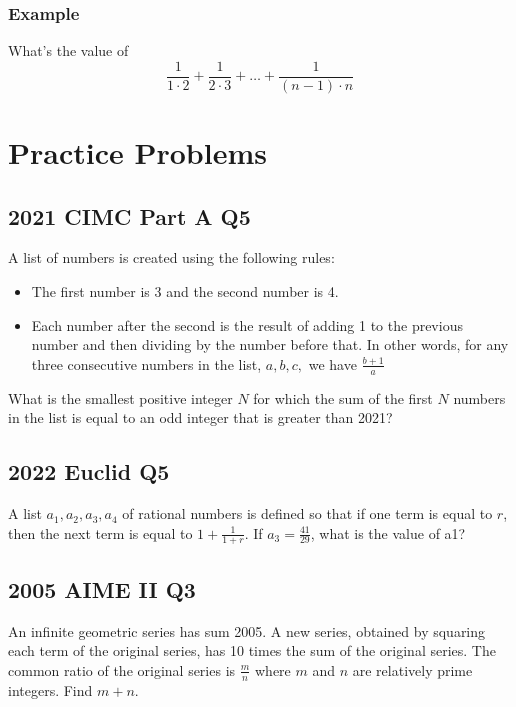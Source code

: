 \documentclass{article}
\begin{document}
\subsubsection{Example}

What's the value of $$\frac{1}{1\cdot2}+\frac{1}{2\cdot3}+\dots+\frac{1}{(n-1)\cdot n}$$
\vspace{100px}

\section{Practice Problems}

\subsection{2021 CIMC Part A Q5}

A list of numbers is created using the following rules:
\begin{itemize}
    \item The first number is 3 and the second number is 4.
    \item Each number after the second is the result of adding 1 to the previous number
    and then dividing by the number before that. In other words, for any three
    consecutive numbers in the list, $a, b, c,$ we have $\frac{b+1}{a}$
\end{itemize}
What is the smallest positive integer $N$ for which the sum of the first $N$ numbers in
the list is equal to an odd integer that is greater than 2021?
\newpage
\subsection{2022 Euclid Q5}
A list $a_1, a_2, a_3, a_4$ of rational numbers is defined so that if one term is equal to $r$,
then  the next term is equal to $1+\frac{1}{1+r}$.  If $a_3=\frac{41}{29}$, what is the value of a1?
\vspace{100px}

\subsection{2005 AIME II Q3}

An infinite geometric series has sum 2005. A new series, obtained by squaring each term of the original series, has 10 times the sum of the original series. The common ratio of the original series is $\frac mn$ where $m$ and $n$ are relatively prime integers. Find $m+n.$
\end{document}
